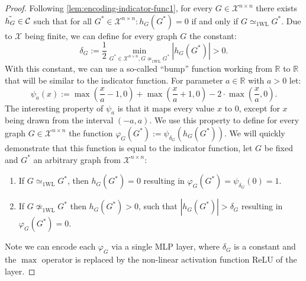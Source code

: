 \documentclass[11pt, dvipsnames, DIV=12]{scrreprt}
\theoremstyle{definition}
\newtheorem{lemma}[theorem]{Lemma}
\newcommand{\cC}{\mathcal{C}}
\newcommand{\cX}{\mathcal{X}}
\newcommand{\Rb}{\mathbb{R}}
\newcommand{\wliso}{\simeq_{\text{1WL}}}
\newcommand{\xnn}{\mathcal{X}^{n \times n}}
\begin{document}
\begin{proof}
    Following \cref{lem:encoding-indicator-func1}, for every $G\in \xnn$ there exists $\Tilde{h_G} \in \cC$ such that for all $G^* \in \xnn: h_G(G^*) = 0$ if and only if $G \wliso G^*$. Due to $\cX$ being finite, we can define for every graph $G$ the constant:
    \begin{equation*}
        \delta_G := \frac{1}{2} \min_{G^* \in \xnn , G \not\wliso G^*} |h_G(G^*)| > 0.
    \end{equation*}
    With this constant, we can use a so-called ``bump'' function working from $\Rb$ to $\Rb$ that will be similar to the indicator function. For parameter $a \in \Rb$ with $a > 0$ let:
    \begin{equation*}
        \psi_a(x) := \max(\frac{x}{a} -1,0) + \max(\frac{x}{a}+1,0) - 2 \cdot \max(\frac{x}{a}, 0).
    \end{equation*}
    The interesting property of $\psi_a$ is that it maps every value $x$ to $0$, except for $x$ being drawn from the interval $(-a, a)$. We use this property to define for every graph $G \in \xnn$ the function $\varphi_G(G^*) := \psi_{\delta_G} (h_G(G^*))$. 
    We will quickly demonstrate that this function is equal to the indicator function, let $G$ be fixed and $G^*$ an arbitrary graph from $\xnn$:
    \begin{enumerate}
        \item If $G \wliso G^*$, then $h_G(G^*) = 0$ resulting in $\varphi_G(G^*) = \psi_{\delta_G}(0) = 1$.
        \item If $G \not\wliso G^*$ then $h_G(G^*) > 0$, such that $|h_G(G^*)|> \delta_G$ resulting in $\varphi_G(G^*) = 0$.
    \end{enumerate}
    Note we can encode each $\varphi_G$ via a single MLP layer, where $\delta_G$ is a constant and the $\max$ operator is replaced by the non-linear activation function ReLU of the layer.
\end{proof}
\end{document}
